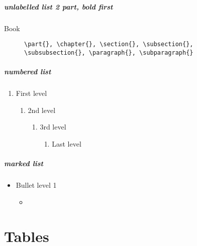 \documentclass{report} %
\begin{document}
\paragraph{unlabelled list 2 part, bold first}
	\begin{description}
		\item[Book]{\verb|\part{}, \chapter{}, \section{}, \subsection{}, \subsubsection{}, \paragraph{}, \subparagraph{}|}
	\end{description}	
	
\paragraph{numbered list}
	\begin{enumerate}
		\item First level
			\begin{enumerate}
				\item 2nd level
					\begin{enumerate}
						\item 3rd level
							\begin{enumerate}
								\item Last level
							\end{enumerate}
					\end{enumerate}
			\end{enumerate}
	\end{enumerate}
	
\paragraph{marked list}
	\begin{itemize}
		\item Bullet level 1
			\begin{itemize}
				\item 
			\end{itemize}
	\end{itemize}

	
\chapter{Tables}
	
\end{document}
